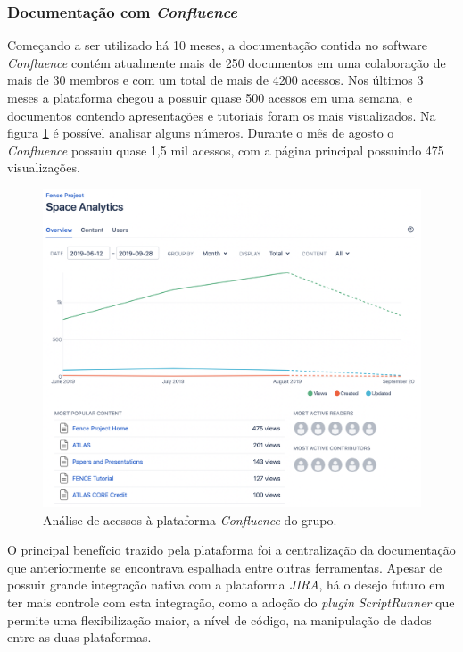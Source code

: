 \hypertarget{documentacao-com-confluence}{%
\subsubsection{\texorpdfstring{Documentação com \emph{Confluence}}{Documentação com Confluence}}\label{documentacao-com-confluence}}

Começando a ser utilizado há 10 meses, a documentação contida no software \emph{Confluence} contém atualmente mais de 250 documentos em uma colaboração de mais de 30 membros e com um total de mais de 4200 acessos. Nos últimos 3 meses a plataforma chegou a possuir quase 500 acessos em uma semana, e documentos contendo apresentações e tutoriais foram os mais visualizados. Na figura \ref{fig:space-analytics} é possível analisar alguns números. Durante o mês de agosto o \emph{Confluence} possuiu quase 1,5 mil acessos, com a página principal possuindo 475 visualizações.

\begin{figure}[H]
    \centering
    \includegraphics[width=15cm]{source/5-resultados/images/space-analytics-censored.png}
    \caption{Análise de acessos à plataforma \emph{Confluence} do grupo.}
    \label{fig:space-analytics}
\end{figure}

O principal benefício trazido pela plataforma foi a centralização da documentação que anteriormente se encontrava espalhada entre outras ferramentas. Apesar de possuir grande integração nativa com a plataforma \emph{JIRA}, há o desejo futuro em ter mais controle com esta integração, como a adoção do \emph{plugin} \emph{ScriptRunner} que permite uma flexibilização maior, a nível de código, na manipulação de dados entre as duas plataformas.


